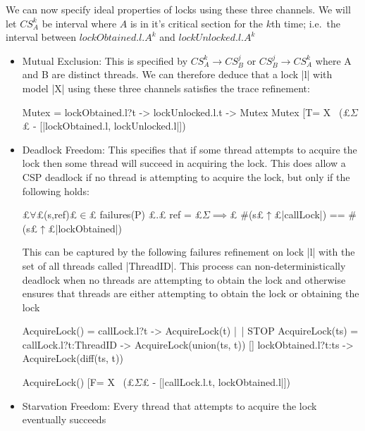 We can now specify ideal properties of locks using these three channels. We will let $CS^{k}_{A}$ be interval where $A$ is in it's critical section for the $k$th time; i.e.~the interval between $lockObtained.l.A^{k}$ and $lockUnlocked.l.A^{k}$
\begin{itemize}
  \item Mutual Exclusion: This is specified by $CS^{k}_{A} \rightarrow CS^{j}_{B}$ or $CS^{j}_{B} \rightarrow CS^{k}_{A}$ where A and B are distinct threads. We can therefore deduce that a lock |l| with model |X| using these three channels satisfies the trace refinement:  
  
  \begin{cspm}
    Mutex = lockObtained.l?t -> lockUnlocked.l.t -> Mutex
    Mutex [T= X \ (£$\Sigma$£ - [|lockObtained.l, lockUnlocked.l|])\end{cspm}

  \item Deadlock Freedom: This specifies that if some thread attempts to acquire the lock then some thread will succeed in acquiring the lock\cite{TAoMP}. This does allow a CSP deadlock if no thread is attempting to acquire the lock, but only if the following holds: 
  
  \begin{cspm}
    £$\forall$£(s,ref)£$ \in$£ failures(P) £$.$£ ref = £$\Sigma \implies$£ #(s£$\uparrow$£{|callLock|}) == #(s£$\uparrow$£{|lockObtained|})\end{cspm}
  
  This can be captured by the following failures refinement on lock |l| with the set of all threads called |ThreadID|. This process can non-deterministically deadlock when no threads are attempting to obtain the lock and otherwise ensures that threads are either attempting to obtain the lock or obtaining the lock

  \begin{cspm}
    AcquireLock({}) = callLock.l?t -> AcquireLock({t}) |~| STOP
    AcquireLock(ts) = callLock.l?t:{ThreadID\ts} -> AcquireLock(union(ts, {t}))
                      [] lockObtained.l?t:ts -> AcquireLock(diff(ts, {t}))

    AcquireLock({}) [F= X \ (£$\Sigma$£ - [|callLock.l.t, lockObtained.l|])

  \end{cspm}
  \item Starvation Freedom: Every thread that attempts to acquire the lock eventually succeeds 
  
\end{itemize}


